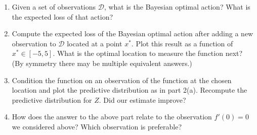 \documentclass{article}
\newcommand{\mc}[1]{\mathcal{#1}}
\newcommand{\data}{\mc{D}}
\begin{document}
\begin{enumerate}
  \begin{enumerate}
  \item
    Given a set of observations $\data$, what is the Bayesian optimal
    action? What is the expected loss of that action?
  \item
    Compute the expected loss of the Bayesian optimal action after
    adding a new observation to $\data$ located at a point $x^\ast$.
    Plot this result as a function of $x^\ast \in [-5, 5]$.  What is
    the optimal location to measure the function next? (By symmetry
    there may be multiple equivalent answers.)
  \item
    Condition the function on an observation of the function at the
    chosen location and plot the predictive distribution as in part
    2(a).  Recompute the predictive distribution for $Z$. Did our
    estimate improve?
  \item
    How does the answer to the above part relate to the observation
    $f'(0) = 0$ we considered above?  Which observation is preferable?
  \end{enumerate}

\end{enumerate}
\end{document}
